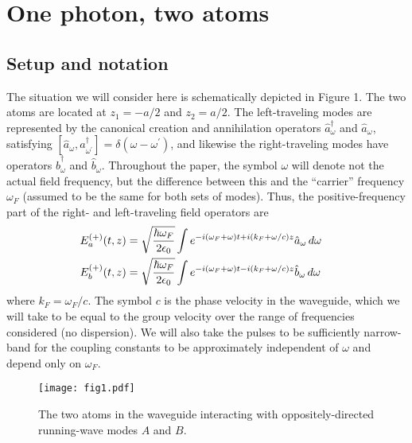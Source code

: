 \documentclass[aps,pra,twocolumn,floatfix,superscriptaddress]{revtex4}
\begin{document}
\section{One photon, two atoms}

\subsection{Setup and notation}

The situation we will consider here is schematically depicted in Figure 1.  The two atoms are located at $z_1 = -a/2$ and $z_2 = a/2$.  The left-traveling modes are represented by the canonical creation and annihilation operators $\hat a^\dagger_\omega$ and $\hat a_\omega$, satisfying $[\hat a_\omega,a^\dagger_{\omega^\prime}] = \delta(\omega-\omega^\prime)$, and likewise the right-traveling modes have operators $\hat b^\dagger_\omega$ and $\hat b_\omega$. Throughout the paper, the symbol $\omega$ will denote not the actual field frequency, but the difference between this and the ``carrier'' frequency $\omega_F$ (assumed to be the same for both sets of modes).  Thus, the positive-frequency part of the right- and left-traveling field operators are
\begin{align}
E_a^{(+)}(t,z) &= \sqrt{\frac{\hbar \omega_F}{2\epsilon_0}}\int e^{-i(\omega_F + \omega)t + i(k_F +\omega/c)z} \hat a_\omega \, d\omega \cr
E_b^{(+)}(t,z) &= \sqrt{\frac{\hbar \omega_F}{2\epsilon_0}}\int e^{-i(\omega_F + \omega)t - i(k_F +\omega/c)z} \hat b_\omega \, d\omega
\label{e1}
\end{align}  
where $k_F = \omega_F/c$.  The symbol $c$ is the phase velocity in the waveguide, which we will take to be equal to the group velocity over the range of frequencies considered (no dispersion).  We will also take the pulses to be sufficiently narrow-band for the coupling constants to be approximately independent of $\omega$ and depend only on $\omega_F$.

\begin{figure}
\texttt{[image: fig1.pdf]}
\caption{\label{fig1} The two atoms in the waveguide interacting with oppositely-directed running-wave modes $A$ and $B$.}
\end{figure}
\end{document}
